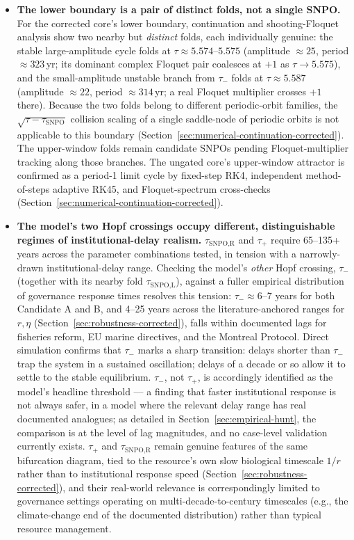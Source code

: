 \documentclass[twocolumn,10pt]{article}
\begin{document}
\begin{itemize}
\item \textbf{The lower boundary is a pair of distinct folds, not a single SNPO.} For the corrected core's lower boundary, continuation and shooting-Floquet analysis show two nearby but \emph{distinct} folds, each individually genuine: the stable large-amplitude cycle folds at $\tau\approx5.574$--$5.575$ (amplitude $\approx25$, period $\approx323$\,yr; its dominant complex Floquet pair coalesces at $+1$ as $\tau\to5.575$), and the small-amplitude unstable branch from $\tau_-$ folds at $\tau\approx5.587$ (amplitude $\approx22$, period $\approx314$\,yr; a real Floquet multiplier crosses $+1$ there). Because the two folds belong to different periodic-orbit families, the $\sqrt{\tau-\tau_{\text{SNPO}}}$ collision scaling of a single saddle-node of periodic orbits is not applicable to this boundary (Section~\ref{sec:numerical-continuation-corrected}). The upper-window folds remain candidate SNPOs pending Floquet-multiplier tracking along those branches. The ungated core's upper-window attractor is confirmed as a period-1 limit cycle by fixed-step RK4, independent method-of-steps adaptive RK45, and Floquet-spectrum cross-checks (Section~\ref{sec:numerical-continuation-corrected}).
\item \textbf{The model's two Hopf crossings occupy different, distinguishable regimes of institutional-delay realism.} $\tau_{\text{SNPO,R}}$ and $\tau_+$ require 65--135+ years across the parameter combinations tested, in tension with a narrowly-drawn institutional-delay range. Checking the model's \emph{other} Hopf crossing, $\tau_-$ (together with its nearby fold $\tau_{\text{SNPO,L}}$), against a fuller empirical distribution of governance response times \cite{hocherman2025} resolves this tension: $\tau_-\approx6$--7 years for both Candidate A and B, and 4--25 years across the literature-anchored ranges for $r,\eta$ (Section~\ref{sec:robustness-corrected}), falls within documented lags for fisheries reform, EU marine directives, and the Montreal Protocol. Direct simulation confirms that $\tau_-$ marks a sharp transition: delays shorter than $\tau_-$ trap the system in a sustained oscillation; delays of a decade or so allow it to settle to the stable equilibrium. $\tau_-$, not $\tau_+$, is accordingly identified as the model's headline threshold — a finding that faster institutional response is not always safer, in a model where the relevant delay range has real documented analogues; as detailed in Section~\ref{sec:empirical-hunt}, the comparison is at the level of lag magnitudes, and no case-level validation currently exists. $\tau_+$ and $\tau_{\text{SNPO,R}}$ remain genuine features of the same bifurcation diagram, tied to the resource's own slow biological timescale $1/r$ rather than to institutional response speed (Section~\ref{sec:robustness-corrected}), and their real-world relevance is correspondingly limited to governance settings operating on multi-decade-to-century timescales (e.g., the climate-change end of the documented distribution) rather than typical resource management.

\end{itemize}
\end{document}
